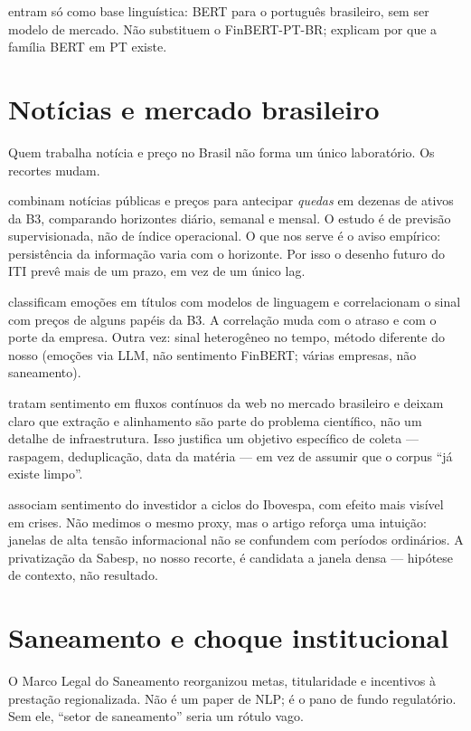  entram só como base linguística: BERT para o português brasileiro, sem ser modelo de mercado. Não substituem o FinBERT-PT-BR; explicam por que a família BERT em PT existe.

\section{Notícias e mercado brasileiro}

Quem trabalha notícia e preço no Brasil não forma um único laboratório. Os recortes mudam.

 combinam notícias públicas e preços para antecipar \emph{quedas} em dezenas de ativos da B3, comparando horizontes diário, semanal e mensal. O estudo é de previsão supervisionada, não de índice operacional. O que nos serve é o aviso empírico: persistência da informação varia com o horizonte. Por isso o desenho futuro do ITI prevê mais de um prazo, em vez de um único lag.

 classificam emoções em títulos com modelos de linguagem e correlacionam o sinal com preços de alguns papéis da B3. A correlação muda com o atraso e com o porte da empresa. Outra vez: sinal heterogêneo no tempo, método diferente do nosso (emoções via LLM, não sentimento FinBERT; várias empresas, não saneamento).

 tratam sentimento em fluxos contínuos da web no mercado brasileiro e deixam claro que extração e alinhamento são parte do problema científico, não um detalhe de infraestrutura. Isso justifica um objetivo específico de coleta --- raspagem, deduplicação, data da matéria --- em vez de assumir que o corpus ``já existe limpo''.

 associam sentimento do investidor a ciclos do Ibovespa, com efeito mais visível em crises. Não medimos o mesmo proxy, mas o artigo reforça uma intuição: janelas de alta tensão informacional não se confundem com períodos ordinários. A privatização da Sabesp, no nosso recorte, é candidata a janela densa --- hipótese de contexto, não resultado.

\section{Saneamento e choque institucional}

O Marco Legal do Saneamento \cite{lei14026} reorganizou metas, titularidade e incentivos à prestação regionalizada. Não é um paper de NLP; é o pano de fundo regulatório. Sem ele, ``setor de saneamento'' seria um rótulo vago.

